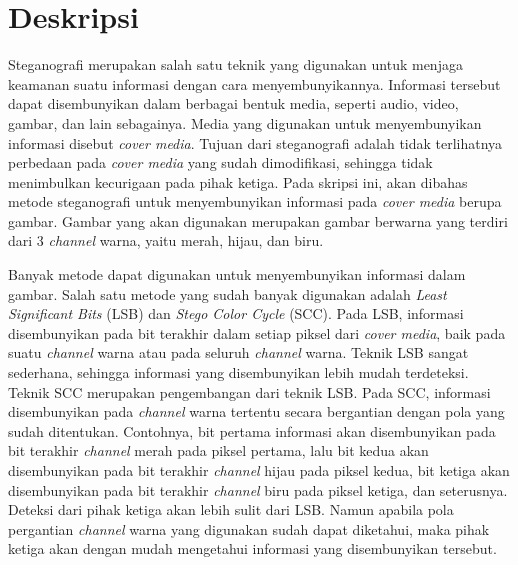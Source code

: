 \documentclass[a4paper,twoside]{article}
\begin{document}
\title{\@judultopik}
\author{\nama \textendash \@npm} 

\newcommand{\nama}{Gavrila Tiominar Sianturi}
\newcommand{\@npm}{2013730025}
\newcommand{\@judultopik}{Steganografi dengan Teknik Indikasi Piksel} %
\newcommand{\jumpemb}{1} %
\newcommand{\tanggal}{13/09/2017}


\maketitle


\section{Deskripsi}
Steganografi merupakan salah satu teknik yang digunakan untuk menjaga keamanan suatu informasi dengan cara menyembunyikannya. Informasi tersebut dapat disembunyikan dalam berbagai bentuk media, seperti audio, video, gambar, dan lain sebagainya. Media yang digunakan untuk menyembunyikan informasi disebut \textit{cover media}. Tujuan dari steganografi adalah tidak terlihatnya perbedaan pada \textit{cover media} yang sudah dimodifikasi, sehingga tidak menimbulkan kecurigaan pada pihak ketiga. Pada skripsi ini, akan dibahas metode steganografi untuk menyembunyikan informasi pada \textit{cover media} berupa gambar. Gambar yang akan digunakan merupakan gambar berwarna yang terdiri dari 3 \textit{channel} warna, yaitu merah, hijau, dan biru.

Banyak metode dapat digunakan untuk menyembunyikan informasi dalam gambar. Salah satu metode yang sudah banyak digunakan adalah \textit{Least Significant Bits} (LSB) dan \textit{Stego Color Cycle} (SCC). Pada LSB, informasi disembunyikan pada bit terakhir dalam setiap piksel dari \textit{cover media}, baik pada suatu \textit{channel} warna atau pada seluruh \textit{channel} warna. Teknik LSB sangat sederhana, sehingga informasi yang disembunyikan lebih mudah terdeteksi. Teknik SCC merupakan pengembangan dari teknik LSB. Pada SCC, informasi disembunyikan pada \textit{channel} warna tertentu secara bergantian dengan pola yang sudah ditentukan. Contohnya, bit pertama informasi akan disembunyikan pada bit terakhir \textit{channel} merah pada piksel pertama, lalu bit kedua akan disembunyikan pada bit terakhir \textit{channel} hijau pada piksel kedua, bit ketiga akan disembunyikan pada bit terakhir \textit{channel} biru pada piksel ketiga, dan seterusnya. Deteksi dari pihak ketiga akan lebih sulit dari LSB. Namun apabila pola pergantian \textit{channel} warna yang digunakan sudah dapat diketahui, maka pihak ketiga akan dengan mudah mengetahui informasi yang disembunyikan tersebut.
\end{document}
